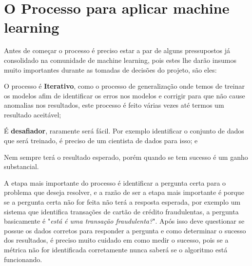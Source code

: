 \section{O Processo para aplicar machine learning}
\label{sec:howtoapplyml}

Antes de começar o processo é preciso estar a par de alguns pressupostos já consolidado na comunidade de machine learning, pois estes lhe darão insumos muito importantes durante 
as tomadas de decisões do projeto, são eles: 
\begin{alineas}
    \item O processo é \textbf{Iterativo}, como o processo de generalização onde temos de treinar os modelos afim de identificar os erros nos modelos e corrigir para que não cause
    anomalias nos resultados, este processo é feito várias vezes até termos um resultado aceitável;
    \item É  \textbf{desafiador}, raramente será fácil. Por exemplo identificar o conjunto de dados que será treinado, é preciso de um cientista de dados para isso; e 
    \item Nem sempre terá o resultado esperado, porém quando se tem sucesso é um ganho substancial.
\end{alineas}
  
A etapa mais importante do processo é identificar a pergunta certa para o problema que deseja resolver, e a razão de ser a etapa mais importante é 
porque se a pergunta certa não for feita não terá a resposta esperada, por exemplo um sistema que identifica transações de cartão de crédito fraudulentas, a 
pergunta basicamente é "\textit{está é uma transação fraudulenta?}". Após isso deve questionar se possue os dados corretos para responder a pergunta e como determinar o sucesso dos resultados,
é preciso muito cuidado em como medir o sucesso, pois se a métrica não for identificada corretamente nunca saberá se o algoritmo está funcionando.



